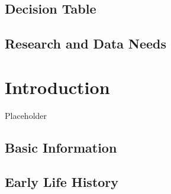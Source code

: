 \documentclass[11pt,
  english,
  a4paper,
]{article}
\begin{document}
\leavevmode\tagmcend\tagstructend


\hypertarget{decision-table}{%
\subsection*{Decision Table}\label{decision-table}}

\leavevmode\tagmcend\tagstructend


\hypertarget{research-and-data-needs}{%
\subsection*{Research and Data Needs}\label{research-and-data-needs}}

\leavevmode\tagmcend\tagstructend

\pagebreak
\setlength{\parskip}{5mm plus1mm minus1mm}
\setcounter{page}{1}
\renewcommand{\thefigure}{\arabic{figure}}
\renewcommand{\thetable}{\arabic{table}}
\setcounter{table}{0}
\setcounter{figure}{0}


\hypertarget{introduction}{%
\section{Introduction}\label{introduction}}

\leavevmode\tagmcend\tagstructend

Placeholder


\hypertarget{basic-information}{%
\subsection{Basic Information}\label{basic-information}}

\leavevmode\tagmcend\tagstructend


\hypertarget{early-life-history}{%
\subsection{Early Life History}\label{early-life-history}}
\end{document}

